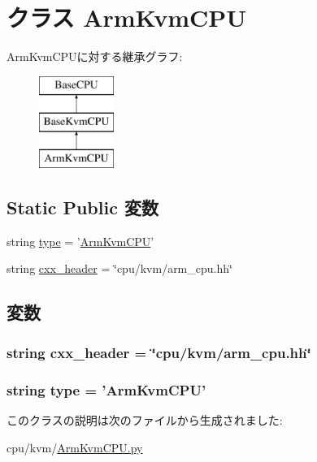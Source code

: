 \hypertarget{classArmKvmCPU_1_1ArmKvmCPU}{
\section{クラス ArmKvmCPU}
\label{classArmKvmCPU_1_1ArmKvmCPU}
}
ArmKvmCPUに対する継承グラフ:\begin{figure}[H]
\begin{center}
\leavevmode
\includegraphics[height=3cm]{classArmKvmCPU_1_1ArmKvmCPU}
\end{center}
\end{figure}
\subsection*{Static Public 変数}
\begin{DoxyCompactItemize}
\item 
string \hyperlink{classArmKvmCPU_1_1ArmKvmCPU_acce15679d830831b0bbe8ebc2a60b2ca}{type} = '\hyperlink{classArmKvmCPU_1_1ArmKvmCPU}{ArmKvmCPU}'
\item 
string \hyperlink{classArmKvmCPU_1_1ArmKvmCPU_a17da7064bc5c518791f0c891eff05fda}{cxx\_\-header} = \char`\"{}cpu/kvm/arm\_\-cpu.hh\char`\"{}
\end{DoxyCompactItemize}


\subsection{変数}
\hypertarget{classArmKvmCPU_1_1ArmKvmCPU_a17da7064bc5c518791f0c891eff05fda}{
\subsubsection[{cxx\_\-header}]{\setlength{\rightskip}{0pt plus 5cm}string {\bf cxx\_\-header} = \char`\"{}cpu/kvm/arm\_\-cpu.hh\char`\"{}}}
\label{classArmKvmCPU_1_1ArmKvmCPU_a17da7064bc5c518791f0c891eff05fda}
\hypertarget{classArmKvmCPU_1_1ArmKvmCPU_acce15679d830831b0bbe8ebc2a60b2ca}{
\subsubsection[{type}]{\setlength{\rightskip}{0pt plus 5cm}string {\bf type} = '{\bf ArmKvmCPU}'}}
\label{classArmKvmCPU_1_1ArmKvmCPU_acce15679d830831b0bbe8ebc2a60b2ca}


このクラスの説明は次のファイルから生成されました:\begin{DoxyCompactItemize}
\item 
cpu/kvm/\hyperlink{ArmKvmCPU_8py}{ArmKvmCPU.py}\end{DoxyCompactItemize}
